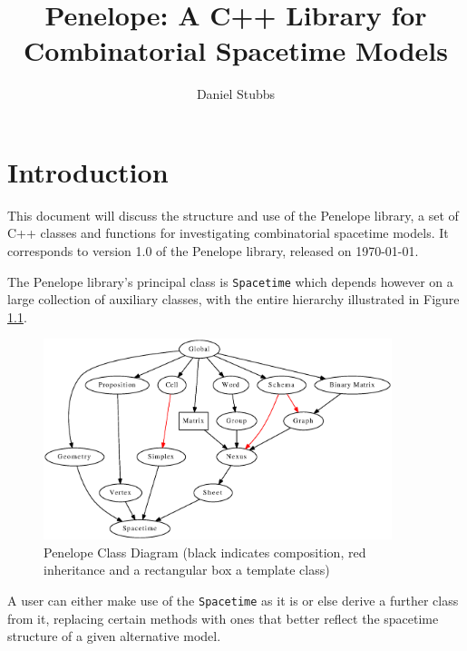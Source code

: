\documentclass[12pt,letterpaper]{report}
\begin{document}
\newcommand{\double}{\par\setlength{\baselineskip}{22pt}}

\providecommand{\abs}[1]{\left\lvert#1\right\rvert}
\providecommand{\norm}[1]{\left\lVert#1\right\rVert}

\pagestyle{plain}

\title{Penelope: A C++ Library for Combinatorial Spacetime Models}
\author{Daniel Stubbs}

\maketitle

\newpage

\double

\chapter{Introduction}

This document will discuss the structure and use of the Penelope library, a set of C++ 
classes and functions for investigating combinatorial spacetime models. It corresponds 
to version 1.0 of the Penelope library, released on \today.  

The Penelope library's principal class is \texttt{Spacetime} which depends however on a 
large collection of auxiliary classes, with the entire hierarchy illustrated in Figure 
\ref{fig:class_hierarchy}. 
\begin{figure}[htb]
\centering
\includegraphics[width=4in]{images/class_hierarchy.eps}
\caption{Penelope Class Diagram (black indicates composition, red inheritance and a 
rectangular box a template class)}
\label{fig:class_hierarchy}
\end{figure}
A user can either make use of the \texttt{Spacetime} as it is or else derive a further class 
from it, replacing certain methods with ones that better reflect the spacetime structure of 
a given alternative model. 
\end{document}
